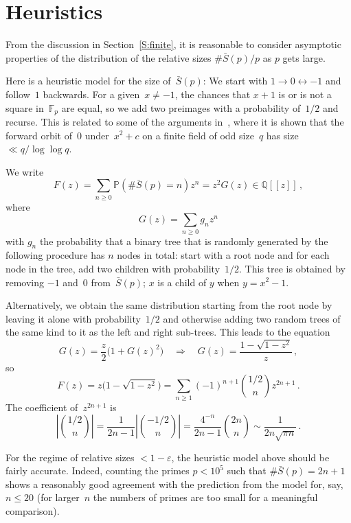 \documentclass[12pt,a4paper]{amsart}
\newcommand{\Q}{{\mathbb Q}}
\newcommand{\F}{{\mathbb F}}
\newcommand{\BP}{{\mathbb P}}
\theoremstyle{definition}
\numberwithin{equation}{section}
\begin{document}

\section{Heuristics} \label{S:heuristics}

From the discussion in Section~\ref{S:finite}, it is reasonable to consider asymptotic
properties of the distribution of the relative sizes $\#\bar{S}(p)/p$ as $p$ gets large.

Here is a heuristic model for the size of~$\bar{S}(p)$:
We start with $1 \to 0 \leftrightarrow -1$ and follow~$1$ backwards.
For a given~$x \neq -1$, the chances that $x+1$ is or is not a square in~$\F_p$ are equal,
so we add two preimages with a probability of~$1/2$ and recurse.
This is related to some of the arguments in~\cite{HeathBrown},
where it is shown that the forward orbit of~$0$ under~$x^2 + c$ on a finite
field of odd size~$q$ has size $\ll q/\log\log q$.

We write
\[ F(z) = \sum_{n \ge 0} \BP(\#\bar{S}(p) = n) z^n = z^2 G(z) \in \Q[\![z]\!] \,, \]
where
\[ G(z) = \sum_{n \ge 0} g_n z^n \]
with $g_n$ the probability that a binary tree that is randomly generated by the
following procedure has $n$ nodes in total: start with a root node and for each
node in the tree, add two children with probability~$1/2$. This tree is obtained
by removing $-1$ and~$0$ from~$\bar{S}(p)$; $x$ is a child of $y$ when $y = x^2 - 1$.

Alternatively, we obtain the same distribution starting from the root node
by leaving it alone with probability~$1/2$ and otherwise adding two random trees
of the same kind to it as the left and right sub-trees. This leads to the equation
\[ G(z) = \frac{z}{2} \bigl(1 + G(z)^2\bigr)  \quad\Longrightarrow\quad  G(z) = \frac{1 - \sqrt{1-z^2}}{z} \,, \]
so
\[ F(z) = z \bigl(1 - \sqrt{1 - z^2}\bigr) = \sum_{n \geqslant 1} (-1)^{n+1} \binom{1/2}{n} z^{2n+1} \,. \]
The coefficient of~$z^{2n+1}$ is
\[ \left|\binom{1/2}{n}\right| = \frac{1}{2n-1} \left|\binom{-1/2}{n}\right|
     = \frac{4^{-n}}{2n-1} \binom{2n}{n}
     \sim \frac{1}{2n \sqrt{\pi n}} \,.
\]

For the regime of relative sizes $< 1 - \varepsilon$, the heuristic model above
should be fairly accurate. Indeed, counting the primes $p < 10^5$ such that $\#\bar{S}(p) = 2n+1$
shows a reasonably good agreement with the prediction from the model for, say, $n \leqslant 20$
(for larger~$n$ the numbers of primes are too small for a meaningful comparison).
\end{document}
